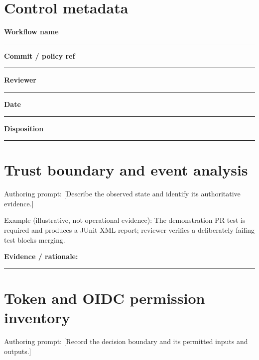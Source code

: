 \documentclass[11pt,letterpaper]{article}
\begin{document}
\makedoctitle\makedocsummary
\section{Control metadata}
\noindent\textbf{Workflow name}\par\nobreak\vspace{6pt}\noindent\rule{0.93\linewidth}{0.4pt}\par\vspace{14pt}
\noindent\textbf{Commit / policy ref}\par\nobreak\vspace{6pt}\noindent\rule{0.93\linewidth}{0.4pt}\par\vspace{14pt}
\noindent\textbf{Reviewer}\par\nobreak\vspace{6pt}\noindent\rule{0.93\linewidth}{0.4pt}\par\vspace{14pt}
\noindent\textbf{Date}\par\nobreak\vspace{6pt}\noindent\rule{0.93\linewidth}{0.4pt}\par\vspace{14pt}
\noindent\textbf{Disposition}\par\nobreak\vspace{6pt}\noindent\rule{0.93\linewidth}{0.4pt}\par\vspace{14pt}
\section{Trust boundary and event analysis}
Authoring prompt: [Describe the observed state and identify its authoritative evidence.]

Example (illustrative, not operational evidence): The demonstration PR test is required and produces a JUnit XML report; reviewer verifies a deliberately failing test blocks merging.

\noindent\textbf{Evidence / rationale:}\par\nobreak\vspace{8pt}\noindent\rule{0.93\linewidth}{0.4pt}\par\vspace{14pt}
\section{Token and OIDC permission inventory}
Authoring prompt: [Record the decision boundary and its permitted inputs and outputs.]
\end{document}
